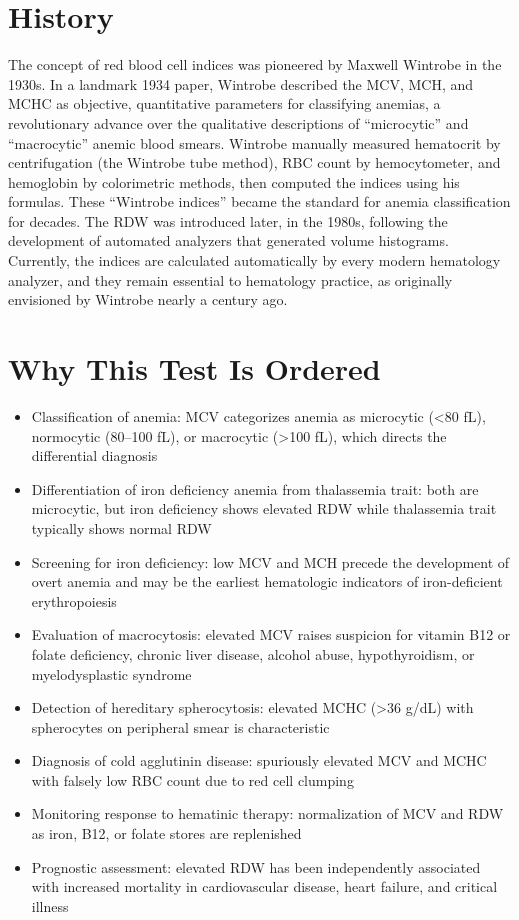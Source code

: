 \section*{History}
The concept of red blood cell indices was pioneered by Maxwell Wintrobe in the 1930s. In a landmark 1934 paper, Wintrobe described the MCV, MCH, and MCHC as objective, quantitative parameters for classifying anemias, a revolutionary advance over the qualitative descriptions of ``microcytic'' and ``macrocytic'' anemic blood smears. Wintrobe manually measured hematocrit by centrifugation (the Wintrobe tube method), RBC count by hemocytometer, and hemoglobin by colorimetric methods, then computed the indices using his formulas. These ``Wintrobe indices'' became the standard for anemia classification for decades. The RDW was introduced later, in the 1980s, following the development of automated analyzers that generated volume histograms. Currently, the indices are calculated automatically by every modern hematology analyzer, and they remain essential to hematology practice, as originally envisioned by Wintrobe nearly a century ago.

\section*{Why This Test Is Ordered}
\begin{itemize}
  \item Classification of anemia: MCV categorizes anemia as microcytic (<80 fL), normocytic (80--100 fL), or macrocytic (>100 fL), which directs the differential diagnosis
  \item Differentiation of iron deficiency anemia from thalassemia trait: both are microcytic, but iron deficiency shows elevated RDW while thalassemia trait typically shows normal RDW
  \item Screening for iron deficiency: low MCV and MCH precede the development of overt anemia and may be the earliest hematologic indicators of iron-deficient erythropoiesis
  \item Evaluation of macrocytosis: elevated MCV raises suspicion for vitamin B12 or folate deficiency, chronic liver disease, alcohol abuse, hypothyroidism, or myelodysplastic syndrome
  \item Detection of hereditary spherocytosis: elevated MCHC (>36 g/dL) with spherocytes on peripheral smear is characteristic
  \item Diagnosis of cold agglutinin disease: spuriously elevated MCV and MCHC with falsely low RBC count due to red cell clumping
  \item Monitoring response to hematinic therapy: normalization of MCV and RDW as iron, B12, or folate stores are replenished
  \item Prognostic assessment: elevated RDW has been independently associated with increased mortality in cardiovascular disease, heart failure, and critical illness
\end{itemize}

